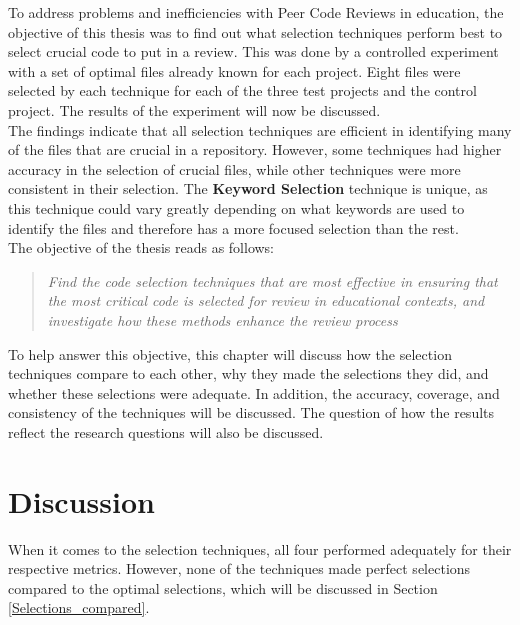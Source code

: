 To address problems and inefficiencies with Peer Code Reviews in education, the objective of this thesis was to find out what selection techniques perform best to select crucial code to put in a review. This was done by a controlled experiment with a set of optimal files already known for each project. Eight files were selected by each technique for each of the three test projects and the control project. The results of the experiment will now be discussed. \\

The findings indicate that all selection techniques are efficient in identifying many of the files that are crucial in a repository. However, some techniques had higher accuracy in the selection of crucial files, while other techniques were more consistent in their selection. The \textbf{Keyword Selection} technique is unique, as this technique could vary greatly depending on what keywords are used to identify the files and therefore has a more focused selection than the rest. \\

\noindent The objective of the thesis reads as follows:
\begin{quote}
    \textit{Find the code selection techniques that are most effective in ensuring that the most critical code is selected for review in educational contexts, and investigate how these methods enhance the review process}
\end{quote}

To help answer this objective, this chapter will discuss how the selection techniques compare to each other, why they made the selections they did, and whether these selections were adequate. In addition, the accuracy, coverage, and consistency of the techniques will be discussed. The question of how the results reflect the research questions will also be discussed. \\



\section{Discussion}

When it comes to the selection techniques, all four performed adequately for their respective metrics. However, none of the techniques made perfect selections compared to the optimal selections, which will be discussed in Section \ref{Selections_compared}. \\


